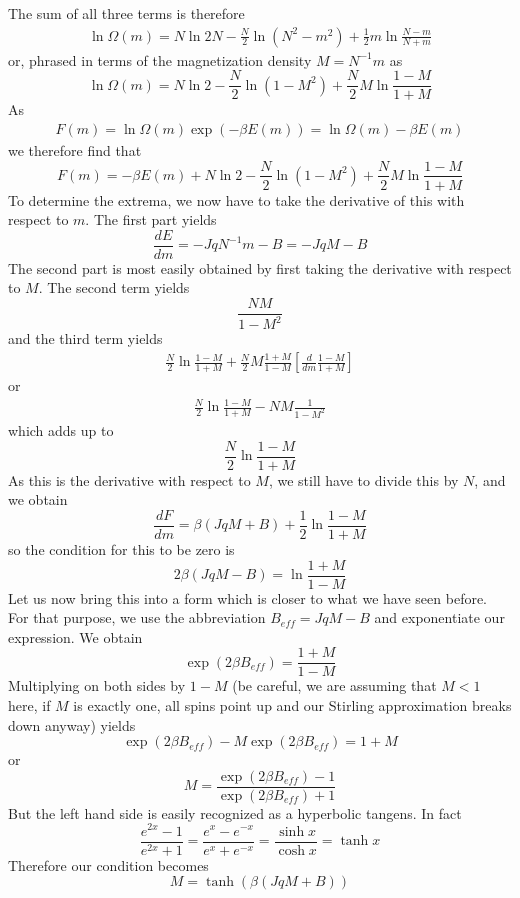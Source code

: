 \documentclass[a4paper, draft]{article}
\theoremstyle{own}
\theoremstyle{remark}
\begin{document}
The sum of all three terms is therefore
\begin{align*}
	\ln \Omega(m) = N \ln 2 N  - \frac{N}{2} \ln (N^2 - m^2)  + \frac{1}{2} m \ln \frac{N - m}{N + m}
\end{align*}
or, phrased in terms of the magnetization density $M = N^{-1} m$ as
$$
\ln \Omega(m) = N \ln 2   - \frac{N}{2} \ln (1 - M^2)  + \frac{N}{2} M  \ln \frac{1 - M}{1 + M}
$$
As
\begin{align*}
F(m) = \ln \Omega(m) \exp(-\beta E(m)) = \ln \Omega(m) - \beta E(m) 
\end{align*}
we therefore find that
$$
F(m) = - \beta E(m) + N \ln 2   - \frac{N}{2} \ln (1 - M^2)  + \frac{N}{2} M  \ln \frac{1 - M}{1 + M}
$$
To determine the extrema, we now have to take the derivative of this with respect to $m$. The first part yields
$$
\frac{dE}{dm} = - J q N^{-1} m - B = - J q M - B
$$
The second part is most easily obtained by first taking the derivative with respect to $M$. The second term yields
$$
\frac{NM}{1 - M^2}
$$
and the third term yields
\begin{align*}
\frac{N}{2} \ln \frac{1 - M}{1 + M} + \frac{N}{2} M  \frac{1 + M}{1 - M} [\frac{d}{dm} \frac{1 - M}{1 + M}] 
\end{align*}
or
\begin{align*}
\frac{N}{2} \ln \frac{1 - M}{1 + M}  - NM   \frac{1}{1 - M^2}
\end{align*}
which adds up to
$$
\frac{N}{2} \ln \frac{1 - M}{1 + M}
$$
As this is the derivative with respect to $M$, we still have to divide this by $N$, and we obtain
$$
\frac{dF}{dm} =  \beta(J q M + B) + \frac{1}{2} \ln \frac{1 - M}{1 + M}
$$
so the condition for this to be zero is
$$
2 \beta(J q M - B) = \ln \frac{1 + M}{1 - M}
$$
Let us now bring this into a form which is closer to what we have seen before. For that purpose, we use the abbreviation $B_{eff} = J q M - B$ and exponentiate our expression. We obtain
$$
\exp(2 \beta B_{eff}) = \frac{1 + M}{1 - M}
$$
Multiplying on both sides by $1 - M$ (be careful, we are assuming that $M < 1$ here, if $M$ is exactly one, all spins point up and our Stirling approximation breaks down anyway) yields
$$
\exp(2 \beta B_{eff}) - M \exp(2 \beta B_{eff}) = 1 + M
$$
or
$$
M = \frac{\exp(2 \beta B_{eff}) - 1}{\exp(2 \beta B_{eff}) + 1} 
$$
But the left hand side is easily recognized as a hyperbolic tangens. In fact
$$
\frac{e^{2x} - 1}{e^{2x} + 1} = \frac{e^{x} - e^{-x}}{e^{x} + e^{-x}} = \frac{\sinh x }{\cosh x} = \tanh x
$$
Therefore our condition becomes
$$
M = \tanh (\beta (JqM + B))
$$
\end{document}
